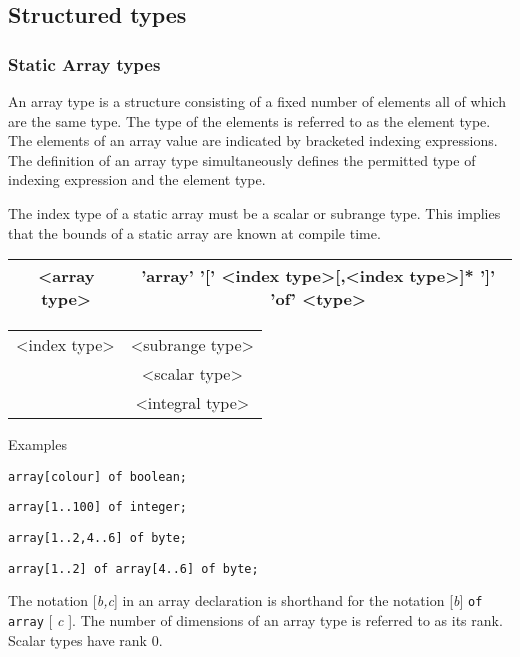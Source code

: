 \subsection{Structured types}


\subsubsection{Static Array types}

An array type is a structure consisting of a fixed number of elements all of
which are the same type. The type of the elements is referred to as the element
type. The elements of an array value are indicated by bracketed indexing expressions.
The definition of an array type simultaneously defines
the permitted type of indexing expression and the element type. 

The index type of a static array
must be a scalar or subrange type. This implies
that the bounds of a static array are known at compile time.

\vspace{0.3cm}
{\centering \begin{tabular}{|c|c|}
\hline 
<array type>&
'array' '{[}' <index type>{[},<index type>{]}{*} '{]}' 'of' <type>\\
\hline 
\end{tabular}\par}
\vspace{0.3cm}

\vspace{0.3cm}
{\centering \begin{tabular}{|c|c|}
\hline 
<index type>&
<subrange type>\\
&
<scalar type>\\
&
<integral type>\\
\hline 
\end{tabular}\par}
\vspace{0.3cm}

Examples

\texttt{array{[}colour{]} of boolean;}

\texttt{array{[}1..100{]} of integer;}

\texttt{array{[}1..2,4..6{]} of byte;}

\texttt{array{[}1..2{]} of array{[}4..6{]} of byte;}

The notation {[}\emph{b,c}{]} in an array declaration is shorthand for the notation
{[}\emph{b}{]} \texttt{of array} {[} \emph{c} {]}. The number of dimensions of an
array type is referred to as its rank. Scalar types have rank 0.


